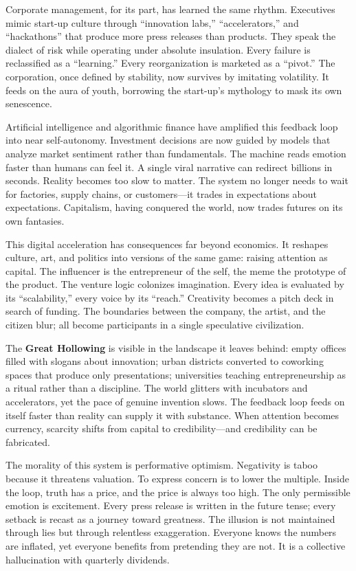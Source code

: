 \documentclass[11pt,twoside]{book}
\begin{document}
Corporate management, for its part, has learned the same rhythm.  Executives mimic start-up culture through “innovation labs,” “accelerators,” and “hackathons” that produce more press releases than products.  They speak the dialect of risk while operating under absolute insulation.  Every failure is reclassified as a “learning.”  Every reorganization is marketed as a “pivot.”  The corporation, once defined by stability, now survives by imitating volatility.  It feeds on the aura of youth, borrowing the start-up’s mythology to mask its own senescence.

Artificial intelligence and algorithmic finance have amplified this feedback loop into near self-autonomy.  Investment decisions are now guided by models that analyze market sentiment rather than fundamentals.  The machine reads emotion faster than humans can feel it.  A single viral narrative can redirect billions in seconds.  Reality becomes too slow to matter.  The system no longer needs to wait for factories, supply chains, or customers—it trades in expectations about expectations.  Capitalism, having conquered the world, now trades futures on its own fantasies.

This digital acceleration has consequences far beyond economics.  It reshapes culture, art, and politics into versions of the same game: raising attention as capital.  The influencer is the entrepreneur of the self, the meme the prototype of the product.  The venture logic colonizes imagination.  Every idea is evaluated by its “scalability,” every voice by its “reach.”  Creativity becomes a pitch deck in search of funding.  The boundaries between the company, the artist, and the citizen blur; all become participants in a single speculative civilization.

The \textbf{Great Hollowing} is visible in the landscape it leaves behind: empty offices filled with slogans about innovation; urban districts converted to coworking spaces that produce only presentations; universities teaching entrepreneurship as a ritual rather than a discipline.  The world glitters with incubators and accelerators, yet the pace of genuine invention slows.  The feedback loop feeds on itself faster than reality can supply it with substance.  When attention becomes currency, scarcity shifts from capital to credibility—and credibility can be fabricated.

The morality of this system is performative optimism.  Negativity is taboo because it threatens valuation.  To express concern is to lower the multiple.  Inside the loop, truth has a price, and the price is always too high.  The only permissible emotion is excitement.  Every press release is written in the future tense; every setback is recast as a journey toward greatness.  The illusion is not maintained through lies but through relentless exaggeration.  Everyone knows the numbers are inflated, yet everyone benefits from pretending they are not.  It is a collective hallucination with quarterly dividends.
\end{document}
